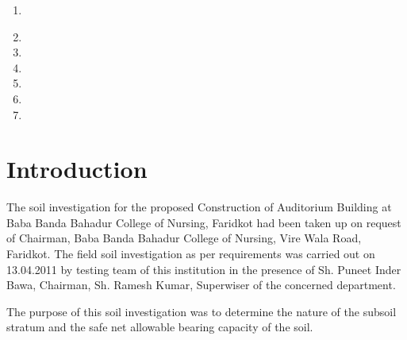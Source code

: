 \documentclass{soil12}
\begin{document}
\clearpage
{}
\begin{enumerate}
\item{
}
\item{}
\item{}
\item{}

\item{}
\item{}
\item{}
\end{enumerate}
\clearpage
\section{Introduction}
The soil investigation for the proposed Construction of Auditorium Building at Baba Banda Bahadur
College of Nursing, Faridkot had been taken up on request of Chairman, Baba Banda Bahadur
College of Nursing, Vire Wala Road, Faridkot. The field soil investigation as per requirements was
carried out on 13.04.2011 by testing team of this institution in the presence of Sh. Puneet Inder Bawa,
Chairman, Sh. Ramesh Kumar, Superwiser of the concerned department.\par
The purpose of this soil investigation was to determine the nature of the subsoil stratum and the safe net
allowable bearing capacity of the soil.
\end{document}
